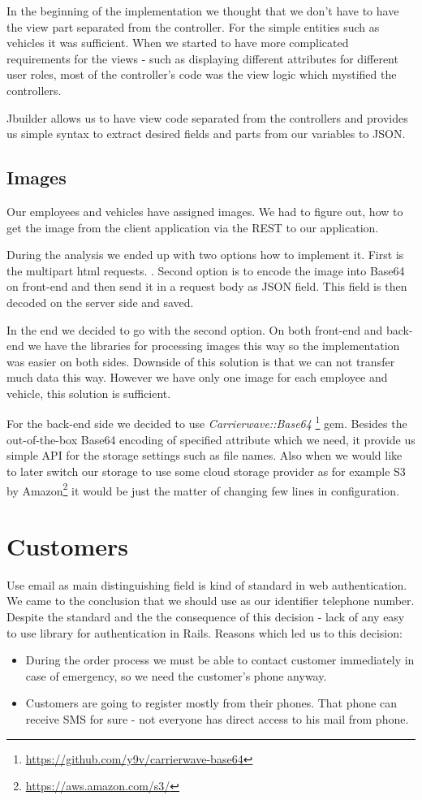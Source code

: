 	In the beginning of the implementation we thought that we don't have to have the view part separated from the controller. For the simple entities such as vehicles it was sufficient. When we started to have more complicated requirements for the views - such as displaying different attributes for different user roles, most of the controller's code was the view logic which mystified the controllers.
	
	Jbuilder allows us to have view code separated from the controllers and provides us simple syntax to extract desired fields and parts from our variables to JSON.
\subsection{Images}
	Our employees and vehicles have assigned images. We had to figure out, how to get the image from the client application via the REST to our application. 
	
	During the analysis we ended up with two options how to implement it. First is the multipart html requests. . Second option is to encode the image into Base64 on front-end and then send it in a request body as JSON field. This field is then decoded on the server side and saved.
	
	In the end we decided to go with the second option. On both front-end and back-end we have the libraries for processing images this way so the implementation was easier on both sides. Downside of this solution is that we can not transfer much data this way. However we have only one image for each employee and vehicle, this solution is sufficient.

	For the back-end side we decided to use \textit{Carrierwave::Base64} \footnote{\url{https://github.com/y9v/carrierwave-base64}} gem. Besides the out-of-the-box Base64 encoding of specified attribute  which we need, it provide us simple API for the storage settings such as file names. Also when we would like to later switch our storage to use some cloud storage provider as for example S3 by Amazon\footnote{\url{https://aws.amazon.com/s3/}} it would be just the matter of changing few lines in configuration. 

\section{Customers}
Use email as main distinguishing field is kind of standard in web authentication. We came to the conclusion that we should use as our identifier telephone number. Despite the standard and the the consequence of this decision - lack of any easy to use library for authentication in Rails. Reasons which led us to this decision:
\begin{itemize}
	\item During the order process we must be able to contact customer immediately in case of emergency, so we need the customer's phone anyway.
	\item Customers are going to register mostly from their phones. That phone can receive SMS for sure - not everyone has direct access to his mail from phone. 
\end{itemize}
